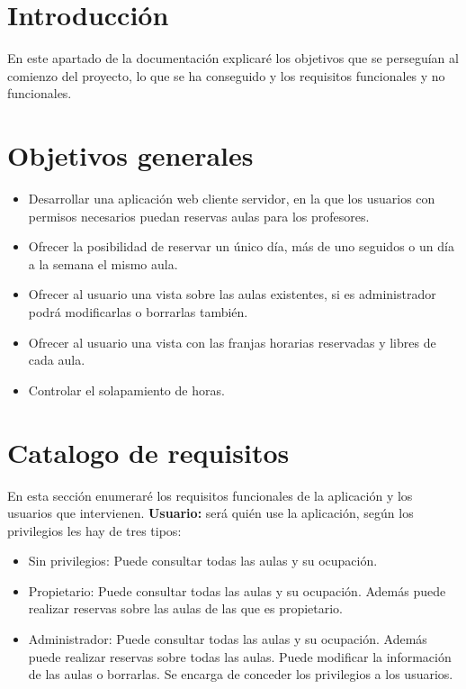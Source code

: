 
\section{Introducción}
En este apartado de la documentación explicaré  los objetivos que se perseguían al comienzo del proyecto, lo que se ha conseguido y los requisitos funcionales y no funcionales.
\section{Objetivos generales}
\begin{itemize}
	\item Desarrollar una aplicación web cliente servidor, en la que los usuarios con permisos necesarios puedan reservas aulas para los profesores.
	\item Ofrecer la posibilidad de reservar un único día, más de uno seguidos o un día a la semana el mismo aula.
	\item Ofrecer al usuario una vista sobre las aulas existentes, si es administrador podrá modificarlas o borrarlas también.
	\item Ofrecer al usuario una vista con las franjas horarias reservadas y libres de cada aula.
	\item Controlar el solapamiento de horas.
\end{itemize}
\section{Catalogo de requisitos}
En esta sección enumeraré los requisitos funcionales de la aplicación y los usuarios que intervienen.
\textbf{Usuario:} será quién use la aplicación, según los privilegios les hay de tres tipos:
    \begin{itemize}
        \item Sin privilegios: Puede consultar todas las aulas y su ocupación.
        \item Propietario: Puede consultar todas las aulas y su ocupación. Además puede realizar reservas sobre las aulas de las que es propietario.
        \item Administrador: Puede consultar todas las aulas y su ocupación. Además puede realizar reservas sobre todas las aulas. Puede modificar la información de las aulas o borrarlas. Se encarga de conceder los privilegios a los usuarios.
    \end{itemize}
